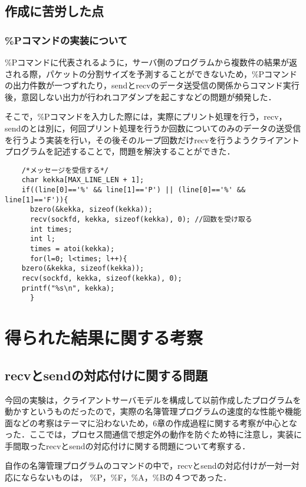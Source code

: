 \documentclass[a4j]{jarticle}
\begin{document}
\subsection{作成に苦労した点}

\subsubsection{\%Pコマンドの実装について}
\%Pコマンドに代表されるように，サーバ側のプログラムから複数件の結果が返される際，パケットの分割サイズを予測することができないため，\%Pコマンドの出力件数が一つずれたり，sendとrecvのデータ送受信の関係からコマンド実行後，意図しない出力が行われコアダンプを起こすなどの問題が頻発した．

そこで，\%Pコマンドを入力した際には，実際にプリント処理を行う，recv，sendのとは別に，何回プリント処理を行うか回数についてのみのデータの送受信を行うよう実装を行い，その後そのループ回数だけrecvを行うようクライアントプログラムを記述することで，問題を解決することができた．

\begin{verbatim}
    /*メッセージを受信する*/
    char kekka[MAX_LINE_LEN + 1];
    if((line[0]=='%' && line[1]=='P') || (line[0]=='%' && line[1]=='F')){
      bzero(&kekka, sizeof(kekka));
      recv(sockfd, kekka, sizeof(kekka), 0); //回数を受け取る
      int times;
      int l;
      times = atoi(kekka);
      for(l=0; l<times; l++){
	bzero(&kekka, sizeof(kekka));
	recv(sockfd, kekka, sizeof(kekka), 0);
	printf("%s\n", kekka);
      }
\end{verbatim}


\section{得られた結果に関する考察}
\subsection{recvとsendの対応付けに関する問題}
今回の実験は，クライアントサーバモデルを構成して以前作成したプログラムを動かすというものだったので，実際の名簿管理プログラムの速度的な性能や機能面などの考察はテーマに沿わないため，6章の作成過程に関する考察が中心となった．ここでは，プロセス間通信で想定外の動作を防ぐため特に注意し，実装に手間取ったrecvとsendの対応付けに関する問題について考察する．

自作の名簿管理プログラムのコマンドの中で，recvとsendの対応付けが一対一対応にならないものは，
\%P，\%F，\%A，\%Bの４つであった．
\end{document}
